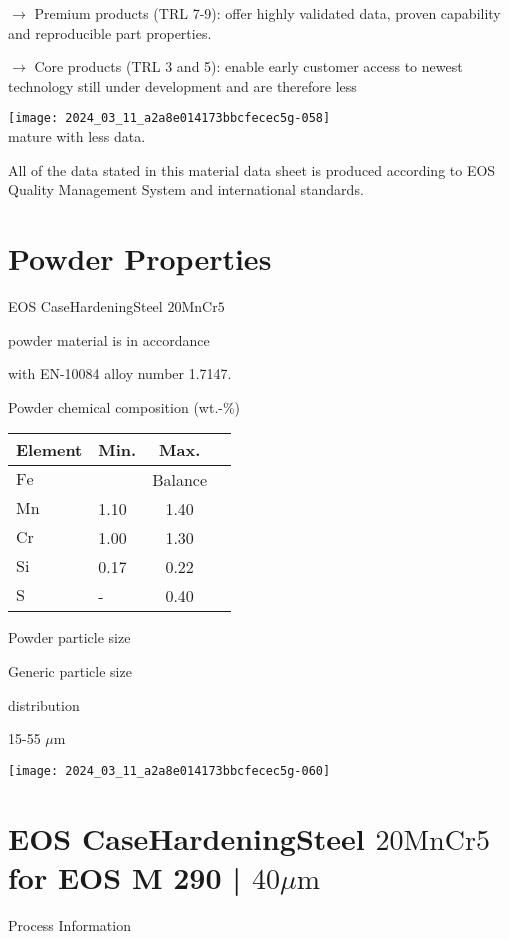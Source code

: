 \documentclass[10pt]{article}
\begin{document}
$\longrightarrow$ Premium products (TRL 7-9): offer highly validated data, proven capability and reproducible part properties.

$\longrightarrow$ Core products (TRL 3 and 5): enable early customer access to newest technology still under development and are therefore less

\texttt{[image: 2024\_03\_11\_a2a8e014173bbcfecec5g-058]}\\
mature with less data.

All of the data stated in this material data sheet is produced according to EOS Quality Management System and international standards.

\section*{Powder Properties}
EOS CaseHardeningSteel $20 \mathrm{MnCr} 5$

powder material is in accordance

with EN-10084 alloy number 1.7147.

Powder chemical composition (wt.-\%)

\begin{center}
\begin{tabular}{llcc}
\hline
Element & Min. & Max. \\
\hline
$\mathrm{Fe}$ &  & Balance \\
\hline
$\mathrm{Mn}$ & 1.10 & 1.40 \\
\hline
$\mathrm{Cr}$ & 1.00 & 1.30 \\
\hline
$\mathrm{Si}$ & 0.17 & 0.22 \\
\hline
$\mathrm{S}$ & - & 0.40 \\
\hline
\end{tabular}
\end{center}

Powder particle size

Generic particle size

distribution

15-55 $\mu \mathrm{m}$

\begin{center}
\texttt{[image: 2024\_03\_11\_a2a8e014173bbcfecec5g-060]}
\end{center}

\section*{EOS CaseHardeningSteel $20 \mathrm{MnCr} 5$ for EOS M 290 | $40 \mu \mathrm{m}$}
Process Information
\end{document}

